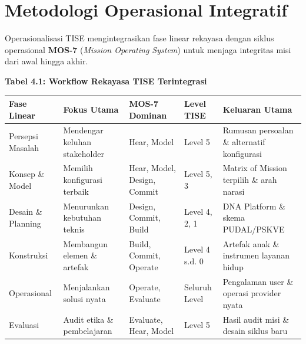 \documentclass[
  letterpaper,
  DIV=11,
  numbers=noendperiod]{scrreprt}
\newcounter{none} %
\begin{document}
\section{Metodologi Operasional
Integratif}\label{metodologi-operasional-integratif}

Operasionalisasi TISE mengintegrasikan fase linear rekayasa dengan
siklus operasional \textbf{MOS-7} (\emph{Mission Operating System})
untuk menjaga integritas misi dari awal hingga akhir.

\textbf{Tabel 4.1: Workflow Rekayasa TISE Terintegrasi}

{\def\LTcaptype{none} %
\begin{longtable}[]{@{}
  >{\raggedright\arraybackslash}p{}
  >{\raggedright\arraybackslash}p{}
  >{\raggedright\arraybackslash}p{}
  >{\raggedright\arraybackslash}p{}
  >{\raggedright\arraybackslash}p{}@{}}
\toprule\noalign{}
\begin{minipage}[b]{\linewidth}\raggedright
Fase Linear
\end{minipage} & \begin{minipage}[b]{\linewidth}\raggedright
Fokus Utama
\end{minipage} & \begin{minipage}[b]{\linewidth}\raggedright
MOS-7 Dominan
\end{minipage} & \begin{minipage}[b]{\linewidth}\raggedright
Level TISE
\end{minipage} & \begin{minipage}[b]{\linewidth}\raggedright
Keluaran Utama
\end{minipage} \\
\midrule\noalign{}
\endhead
\bottomrule\noalign{}
\endlastfoot
Persepsi Masalah & Mendengar keluhan stakeholder & Hear, Model & Level 5
& Rumusan persoalan \& alternatif konfigurasi \\
Konsep \& Model & Memilih konfigurasi terbaik & Hear, Model, Design,
Commit & Level 5, 3 & Matrix of Mission terpilih \& arah narasi \\
Desain \& Planning & Menurunkan kebutuhan teknis & Design, Commit, Build
& Level 4, 2, 1 & DNA Platform \& skema PUDAL/PSKVE \\
Konstruksi & Membangun elemen \& artefak & Build, Commit, Operate &
Level 4 s.d. 0 & Artefak anak \& instrumen layanan hidup \\
Operasional & Menjalankan solusi nyata & Operate, Evaluate & Seluruh
Level & Pengalaman user \& operasi provider nyata \\
Evaluasi & Audit etika \& pembelajaran & Evaluate, Hear, Model & Level 5
& Hasil audit misi \& desain siklus baru \\
\end{longtable}
}
\end{document}

